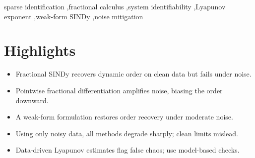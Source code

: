 \documentclass[review,3p,times]{elsarticle}
\begin{document}
\begin{frontmatter}
\begin{abstract}
$35$--$45$ dB and pointwise to $60$--$70$ dB ($15$--$30$ dB each), while Tikhonov, re-scored under the same rule, loses to weak-form at every order and with fixed $\lambda$ fails outright at $\alpha_t = 0.5$---and the monotone-in-$\alpha$ ordering does not survive; weak-form remains the only deployable selector among the mitigations tested, but a modest one. The practitioner takeaway is that data-driven fractional order selection must be anchored to model-based diagnostics, and clean-data brackets should not be read as deployable thresholds. The monotone $A(\alpha)$ ordering, the clean two-sided identifiability, and the weak-form rescue all reproduce on an independent fractional Van der Pol benchmark. Finally, for the same system, variational Benettin integration confirms a stable fixed point ($\lambda_{\max} = -0.073362$) while data-driven Rosenstein estimates yield spurious positive exponents ($+0.010285$ transient, $+0.043278$ stationary, $+0.018965$ overall), underscoring that tangent-space diagnostics, not data-driven ones, arbitrate stability on transient or flat trajectories.
\end{abstract}

\begin{keyword}
sparse identification \sep fractional calculus \sep system identifiability \sep Lyapunov exponent \sep weak-form SINDy \sep noise mitigation
\end{keyword}

\end{frontmatter}

\section*{Highlights}
\begin{itemize}
  \item Fractional SINDy recovers dynamic order on clean data but fails under noise.
  \item Pointwise fractional differentiation amplifies noise, biasing the order downward.
  \item A weak-form formulation restores order recovery under moderate noise.
  \item Using only noisy data, all methods degrade sharply; clean limits mislead.
  \item Data-driven Lyapunov estimates flag false chaos; use model-based checks.
\end{itemize}
\end{document}

